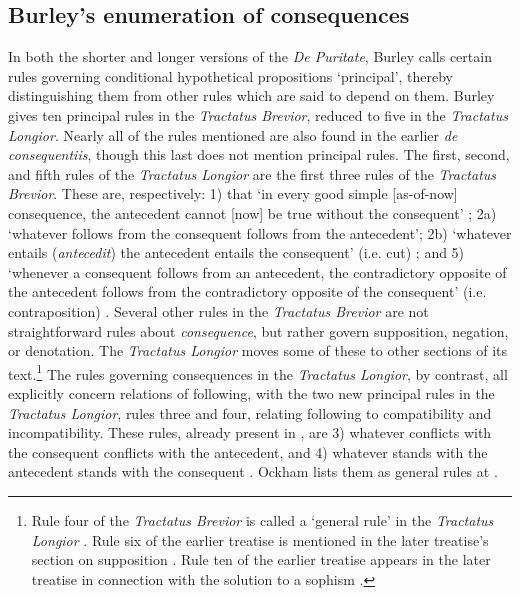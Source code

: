 \documentclass[]{article}
\begin{document}
\subsection{Burley's enumeration of consequences}
In both the shorter and longer versions of the \textit{De Puritate}, Burley calls certain rules governing conditional hypothetical propositions `principal', thereby distinguishing them from other rules which are said to depend on them. Burley gives ten principal rules in the \textit{Tractatus Brevior}, reduced to five in the \textit{Tractatus Longior}. Nearly all of the rules mentioned are also found in the earlier \textit{de consequentiis}, though this last does not mention principal rules. The first, second, and fifth rules of the \textit{Tractatus Longior} are the first three rules of the \textit{Tractatus Brevior}. These are, respectively: 1) that `in every good simple [as-of-now] consequence, the antecedent cannot [now] be true without the consequent' \cite[p. 61.30-37, 199.26-27]{BurleyDPAL}; 2a) `whatever follows from the consequent follows from the antecedent'; 2b) `whatever entails (\textit{antecedit}) the antecedent entails the consequent' (i.e. cut) \cite[p. 62, 9-13]{BurleyDPAL}; and 5) `whenever a consequent follows from an antecedent, the contradictory opposite of the antecedent follows from the contradictory opposite of the consequent' (i.e. contraposition) \cite[p. 64.20-22]{BurleyDPAL}. Several other rules in the \textit{Tractatus Brevior} are not straightforward rules about \textit{consequence}, but rather govern supposition, negation, or denotation. The \textit{Tractatus Longior} moves some of these to other sections of its text.\footnote{Rule four of the \textit{Tractatus Brevior} \cite[p. 208.12-13]{BurleyDPAL} is called a `general rule' in the \textit{Tractatus Longior} \cite[p. 73.29]{BurleyDPAL}. Rule six of the earlier treatise \cite[p. 210.11-12]{BurleyDPAL} is mentioned in the later treatise's section on supposition \cite[27.11]{BurleyDPAL}. Rule ten of the earlier treatise \cite[p. 219.1-2]{BurleyDPAL} appears in the later treatise in connection with the solution to a sophism \cite[p. 141.26-30]{BurleyDPAL}.} The rules governing consequences in the \textit{Tractatus Longior}, by contrast, all explicitly concern relations of following, with the two new principal rules in the \textit{Tractatus Longior}, rules three and four, relating following to compatibility and incompatibility. These rules, already present in \cite[p. 133, par. 88]{Green-Pedersen1980b}, are 3) whatever conflicts with the consequent conflicts with the antecedent, and 4) whatever stands with the antecedent stands with the consequent \cite[pp. 63.7-10, 64.20-22]{BurleyDPAL}. Ockham lists them as general rules at \cite[III-3. 38, pp. 727-731]{OckhamSL}.
\end{document}
